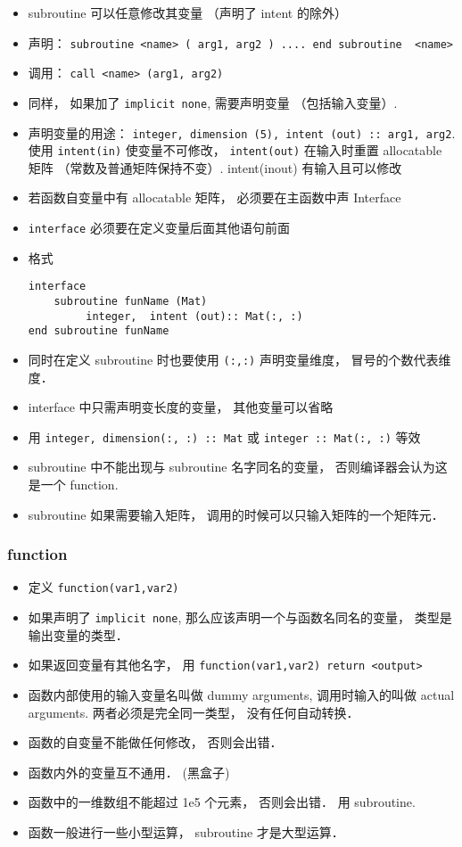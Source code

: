 \begin{itemize}
\item subroutine 可以任意修改其变量 （声明了 intent 的除外）
\item 声明： \verb`subroutine <name> ( arg1, arg2 ) .... end subroutine  <name>`
\item 调用：  \verb`call <name> (arg1, arg2)`
\item 同样， 如果加了 \verb`implicit none`,  需要声明变量 （包括输入变量）.
\item 声明变量的用途： \verb`integer, dimension (5), intent (out) :: arg1, arg2`. 使用 \verb`intent(in)` 使变量不可修改， \verb`intent(out)` 在输入时重置 allocatable 矩阵 （常数及普通矩阵保持不变）. intent(inout) 有输入且可以修改
\item 若函数自变量中有 allocatable 矩阵， 必须要在主函数中声 Interface
\item \verb`interface` 必须要在定义变量后面其他语句前面
\item 格式
\begin{lstlisting}
interface
    subroutine funName (Mat)
         integer,  intent (out):: Mat(:, :)
end subroutine funName
\end{lstlisting}
\item 同时在定义 subroutine 时也要使用 \verb`(:,:)` 声明变量维度， 冒号的个数代表维度．
\item interface 中只需声明变长度的变量， 其他变量可以省略
\item 用 \verb|integer, dimension(:, :) :: Mat| 或 \verb|integer :: Mat(:, :)| 等效
\item subroutine 中不能出现与 subroutine 名字同名的变量， 否则编译器会认为这是一个 function.
\item subroutine 如果需要输入矩阵， 调用的时候可以只输入矩阵的一个矩阵元．
\end{itemize}

\subsubsection{function}
\begin{itemize}
\item 定义 \verb`function(var1,var2)`
\item 如果声明了 \verb|implicit none|, 那么应该声明一个与函数名同名的变量， 类型是输出变量的类型．
\item 如果返回变量有其他名字， 用 \verb|function(var1,var2) return <output>|
\item 函数内部使用的输入变量名叫做 dummy arguments, 调用时输入的叫做 actual arguments. 两者必须是完全同一类型， 没有任何自动转换．
\item 函数的自变量不能做任何修改， 否则会出错．
\item 函数内外的变量互不通用． (黑盒子)
\item 函数中的一维数组不能超过 1e5 个元素， 否则会出错． 用 subroutine.
\item 函数一般进行一些小型运算， subroutine 才是大型运算．
\end{itemize}

